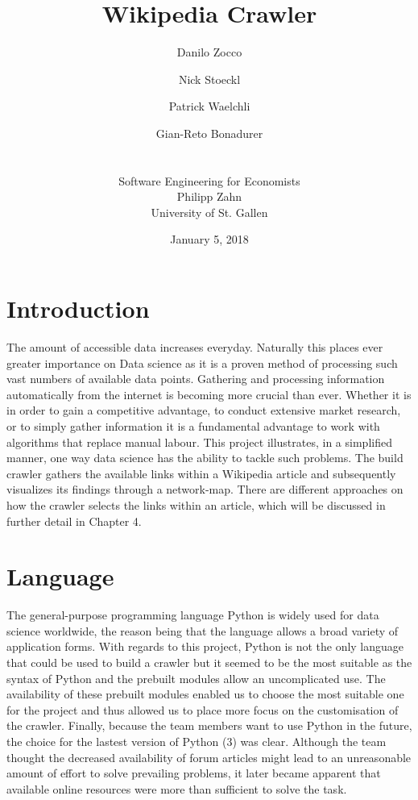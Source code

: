 \documentclass[10pt]{article}
\title{Wikipedia Crawler}
\author{Danilo Zocco\\ 
	\and Nick Stoeckl\\ 	
	\and Patrick Waelchli\\ 
	\and Gian-Reto Bonadurer\\ 
	\\ \\
	\small Software Engineering for Economists\\
	\small Philipp Zahn\\
	\small University of St. Gallen}
\date{January 5, 2018}
\begin{document}
\maketitle
\newpage


\tableofcontents

\newpage

\section{Introduction}

The amount of accessible data increases everyday. Naturally this places ever greater importance on Data science as it is a proven method of processing such vast numbers of available data points. Gathering and processing information automatically from 
the internet is becoming more crucial than ever. Whether it is in order to gain a competitive advantage, to conduct extensive market research, or to simply gather information it is a fundamental advantage to work with algorithms that replace manual labour. 
This project illustrates, in a simplified manner, one way data science has the ability to tackle such problems. The build crawler gathers the available links within a Wikipedia article and subsequently visualizes its findings through a network-map. 
There are different approaches on how the crawler selects the links within an article, which will be discussed in further detail in Chapter 4.

\section{Language}

The general-purpose programming language Python is widely used for data science worldwide, the reason being that the language allows a broad variety of application forms. With regards to this project, Python is not the only language that could be used to build a crawler but it seemed to be the most suitable as the syntax of Python and the prebuilt modules allow an uncomplicated use. The availability of these prebuilt modules enabled us to choose the most suitable one for the project and thus allowed us to place more focus on the customisation of the crawler. Finally, because the team members want to use Python in the future, the choice for the lastest version of Python (3) was clear. Although the team thought the decreased availability of forum articles might lead to an unreasonable amount of effort to solve prevailing problems, it later became apparent that available online resources were more than sufficient to solve the task. 
\end{document}
